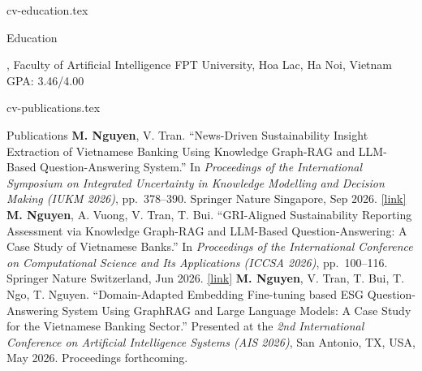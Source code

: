 \begin{filecontents*}[overwrite]{cv-education.tex}
\begin{rubric}{Education}

\entry*[2022 -- 2025]
, Faculty of Artificial Intelligence \newline
FPT University, Hoa Lac, Ha Noi, Vietnam \quad GPA: 3.46/4.00

\end{rubric}
\end{filecontents*}

\begin{filecontents*}[overwrite]{cv-publications.tex}
\begin{rubric}{Publications}
\entry*[2026]
\textbf{M. Nguyen}, V. Tran. ``News-Driven Sustainability Insight Extraction of Vietnamese Banking Using Knowledge Graph-RAG and LLM-Based Question-Answering System.'' In \textit{Proceedings of the International Symposium on Integrated Uncertainty in Knowledge Modelling and Decision Making (IUKM 2026)}, pp.~378--390. Springer Nature Singapore, Sep 2026. \href{https://scholar.google.com/citations?hl=en&user=v25olzwAAAAJ}{[link]}
\entry*[2026]
\textbf{M. Nguyen}, A. Vuong, V. Tran, T. Bui. ``GRI-Aligned Sustainability Reporting Assessment via Knowledge Graph-RAG and LLM-Based Question-Answering: A Case Study of Vietnamese Banks.'' In \textit{Proceedings of the International Conference on Computational Science and Its Applications (ICCSA 2026)}, pp.~100--116. Springer Nature Switzerland, Jun 2026. \href{https://scholar.google.com/citations?hl=en&user=v25olzwAAAAJ}{[link]}
\entry*[2026]
\textbf{M. Nguyen}, V. Tran, T. Bui, T. Ngo, T. Nguyen. ``Domain-Adapted Embedding Fine-tuning based ESG Question-Answering System Using GraphRAG and Large Language Models: A Case Study for the Vietnamese Banking Sector.'' Presented at the \textit{2nd International Conference on Artificial Intelligence Systems (AIS 2026)}, San Antonio, TX, USA, May 2026. Proceedings forthcoming.

\end{rubric}
\end{filecontents*}

